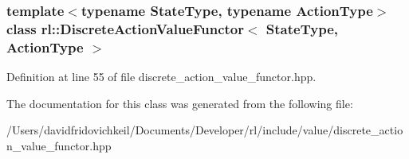\subsubsection*{template$<$typename State\+Type, typename Action\+Type$>$\newline
class rl\+::\+Discrete\+Action\+Value\+Functor$<$ State\+Type, Action\+Type $>$}



Definition at line 55 of file discrete\+\_\+action\+\_\+value\+\_\+functor.\+hpp.



The documentation for this class was generated from the following file\+:\begin{DoxyCompactItemize}
\item 
/\+Users/davidfridovichkeil/\+Documents/\+Developer/rl/include/value/discrete\+\_\+action\+\_\+value\+\_\+functor.\+hpp\end{DoxyCompactItemize}
